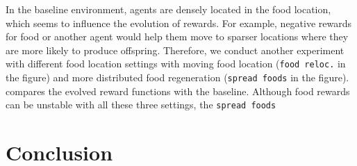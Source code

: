 In the baseline environment, agents are densely located in the food location, which seems to influence the evolution of rewards. For example, negative rewards for food or another agent would help them move to sparser locations where they are more likely to produce offspring. Therefore, we conduct another experiment with different food location settings with moving food location (\texttt{food reloc.} in the figure) and more distributed food regeneration (\texttt{spread foods} in the figure).  compares the evolved reward functions with the baseline. Although food rewards can be unstable with all these three settings, the \texttt{spread foods}

\section{Conclusion}